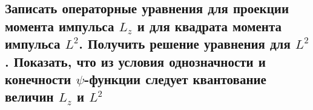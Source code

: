 \subsection{Записать операторные уравнения для проекции момента импульса $L_z$ и для квадрата момента
импульса $L^2$. Получить решение уравнения для $L^2$. Показать, что из условия однозначности
и конечности $\psi$-функции следует квантование величин $L_z$ и $L^2$ }


